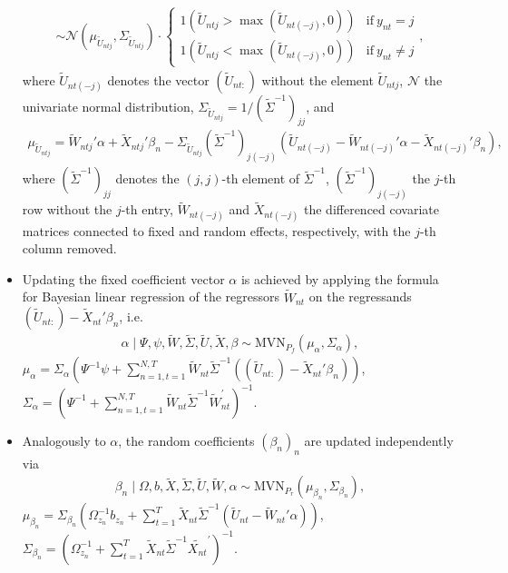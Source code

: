 \documentclass[article]{jss}
\begin{document}
\begin{itemize}
\begin{align*}
  \sim \mathcal{N}(\mu_{\tilde{U}_{ntj}},\Sigma_{\tilde{U}_{ntj}}) \cdot \begin{cases}
  1(\tilde{U}_{ntj}>\max(\tilde{U}_{nt(-j)},0) ) & \text{if}~ y_{nt}=j\\
  1(\tilde{U}_{ntj}<\max(\tilde{U}_{nt(-j)},0) ) & \text{if}~ y_{nt}\neq j
  \end{cases},
  \end{align*}
  where $\tilde{U}_{nt(-j)}$ denotes the vector $(\tilde{U}_{nt:})$ without the element $\tilde{U}_{ntj}$, $\mathcal{N}$ the univariate normal distribution, $\Sigma_{\tilde{U}_{ntj}} = 1/(\tilde{\Sigma}^{-1})_{jj}$, and
  \begin{align*}
  \mu_{\tilde{U}_{ntj}} = \tilde{W}_{ntj}'\alpha + \tilde{X}_{ntj}'\beta_n - \Sigma_{\tilde{U}_{ntj}} (\tilde{\Sigma}^{-1})_{j(-j)}   (\tilde{U}_{nt(-j)} - \tilde{W}_{nt(-j)}'\alpha - \tilde{X}_{nt(-j)}' \beta_n ),
  \end{align*}
  where $(\tilde{\Sigma}^{-1})_{jj}$ denotes the $(j,j)$-th element of $\tilde{\Sigma}^{-1}$, $(\tilde{\Sigma}^{-1})_{j(-j)}$ the $j$-th row without the $j$-th entry, $\tilde{W}_{nt(-j)}$ and $\tilde{X}_{nt(-j)}$ the differenced covariate matrices connected to fixed and random effects, respectively, with the $j$-th column removed.
  \item Updating the fixed coefficient vector $\alpha$ is achieved by applying the formula for Bayesian linear regression of the regressors $\tilde{W}_{nt}$ on the regressands $(\tilde{U}_{nt:})-\tilde{X}_{nt}'\beta_n$, i.e.\
  \begin{align*}
  \alpha \mid \Psi,\psi,\tilde{W},\tilde{\Sigma},\tilde{U},\tilde{X},\beta \sim \text{MVN}_{P_f}(\mu_\alpha,\Sigma_\alpha),
  \end{align*}
  $\mu_\alpha = \Sigma_\alpha (\Psi^{-1}\psi + \sum_{n=1,t=1}^{N,T} \tilde{W}_{nt} \tilde{\Sigma}^{-1} ((\tilde{U}_{nt:})-\tilde{X}_{nt}'\beta_n) )$, $\Sigma_\alpha = (\Psi^{-1} + \sum_{n=1,t=1}^{N,T} \tilde{W}_{nt}\tilde{\Sigma}^{-1} \tilde{W}_{nt}^{'} )^{-1}$.
  \item Analogously to $\alpha$, the random coefficients $(\beta_n)_n$ are updated independently via
  \begin{align*}
  \beta_n \mid \Omega,b,\tilde{X},\tilde{\Sigma},\tilde{U},\tilde{W},\alpha \sim \text{MVN}_{P_r}(\mu_{\beta_n},\Sigma_{\beta_n}),
  \end{align*}
  $\mu_{\beta_n} = \Sigma_{\beta_n} (\Omega_{z_n}^{-1}b_{z_n} + \sum_{t=1}^{T} \tilde{X}_{nt} \tilde{\Sigma}^{-1} (\tilde{U}_{nt}-\tilde{W}_{nt}'\alpha) )$, $\Sigma_{\beta_n} = (\Omega_{z_n}^{-1} + \sum_{t=1}^{T} \tilde{X}_{nt}\tilde{\Sigma}^{-1} \tilde{X_{nt}}^{'} )^{-1}$.

\end{itemize}
\end{document}

